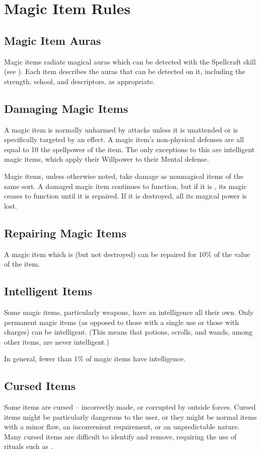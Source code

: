 \section{Magic Item Rules}

    \subsection{Magic Item Auras}

        Magic items radiate magical auras which can be detected with the Spellcraft skill (see ).
        Each item describes the auras that can be detected on it, including the strength, school, and descriptors, as appropriate.

    \subsection{Damaging Magic Items}

        A magic item is normally unharmed by attacks unless it is unattended or is specifically targeted by an effect.
        A magic item's non-physical defenses are all equal to 10 \add the spellpower of the item.
        The only exceptions to this are intelligent magic items, which apply their Willpower to their Mental defense.

        Magic items, unless otherwise noted, take damage as nonmagical items of the same sort.
        A damaged magic item continues to function, but if it is , its magic ceases to function until it is repaired.
        If it is destroyed, all its magical power is lost.

    \subsection{Repairing Magic Items}

        A magic item which is  (but not destroyed) can be repaired for 10\% of the value of the item.

    \subsection{Intelligent Items}

        Some magic items, particularly weapons, have an intelligence all their own.
        Only permanent magic items (as opposed to those with a single use or those with charges) can be intelligent.
        (This means that potions, scrolls, and wands, among other items, are never intelligent.)

        In general, fewer than 1\% of magic items have intelligence.

    \subsection{Cursed Items}

        Some items are cursed -- incorrectly made, or corrupted by outside forces.
        Cursed items might be particularly dangerous to the user, or they might be normal items with a minor flaw, an inconvenient requirement, or an unpredictable nature.
        Many cursed items are difficult to identify and remove, requiring the use of rituals such as .
